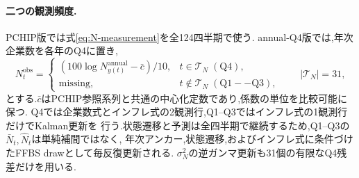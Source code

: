\documentclass[11pt]{article}
\begin{document}
\paragraph{二つの観測頻度.} PCHIP版では式\eqref{eq:N-measurement}を全124四半期で使う.
annual-Q4版では,年次企業数を各年のQ4に置き,
\begin{equation}
N_t^{\mathrm{obs}}=
\begin{cases}
(100\log N_{y(t)}^{\mathrm{annual}}-\bar c)/10,&t\in\mathcal T_N\;(\mathrm{Q4}),\\
\mathrm{missing},&t\notin\mathcal T_N\;(\mathrm{Q1--Q3}),
\end{cases}
\qquad |\mathcal T_N|=31,
\label{eq:annual-q4-observation}
\end{equation}
とする.$\bar c$はPCHIP参照系列と共通の中心化定数であり,係数の単位を比較可能に保つ.
Q4では企業数式とインフレ式の2観測行,Q1--Q3ではインフレ式の1観測行だけでKalman更新を
行う.状態遷移と予測は全四半期で継続するため,Q1--Q3の$\bar N_t,\hat N_t$は単純補間ではなく,
年次アンカー,状態遷移,およびインフレ式に条件づけたFFBS drawとして毎反復更新される.
$\sigma_N^2$の逆ガンマ更新も31個の有限なQ4残差だけを用いる.
\end{document}
